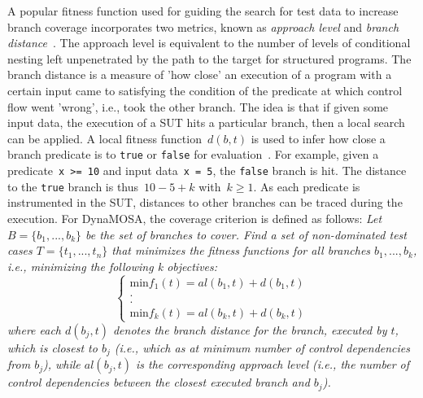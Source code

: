 \documentclass{article}
\begin{document}
A popular fitness function used for guiding the search for test data to increase branch coverage incorporates two metrics, known as \textit{approach level} and \textit{branch distance}~\cite{Wegener2001}. The approach level is equivalent to the number of levels of conditional nesting left unpenetrated by the path to the target for structured programs. The branch distance is a measure of 'how close' an execution of a program with a certain input came to satisfying the condition of the predicate at which control flow went 'wrong', i.e., took the other branch. The idea is that if given some input data, the execution of a \ac{SUT} hits a particular branch, then a local search can be applied. A local fitness function~$d(b, t)$ is used to infer how close a branch predicate is to \lstinline{true} or \lstinline{false} for evaluation~\cite{McMinn_2004}. For example, given a predicate~\lstinline{x >= 10} and input data~\lstinline{x = 5}, the \lstinline{false} branch is hit. The distance to the \lstinline{true} branch is thus~$10 - 5 + k$ with~$k \geq 1$. As each predicate is instrumented in the \ac{SUT}, distances to other branches can be traced during the execution. For \ac{DynaMOSA}, the coverage criterion is defined as follows: \textit{Let $B = \{b_1, ..., b_k\}$ be the set of branches to cover. Find a set of non-dominated test cases $T = \{t_1,...,t_n\}$ that minimizes the fitness functions for all branches $b_1, ..., b_k$, i.e., minimizing the following k objectives:}
\[
     \left\{\begin{array}{l}
         \text{min}f_1(t) = al(b_1,t) + d(b_1,t)\\
         . \\
         . \\
         \text{min}f_k(t) = al(b_k,t) + d(b_k,t)
        \end{array}
    \right.
  \]
\textit{where each $d(b_j, t)$ denotes the branch distance for the branch, executed by $t$, which is closest to $b_j$ (i.e., which as at minimum number of control dependencies from $b_j$), while $al(b_j,t)$ is the corresponding approach level (i.e., the number of control dependencies between the closest executed branch and $b_j$).}
\end{document}
